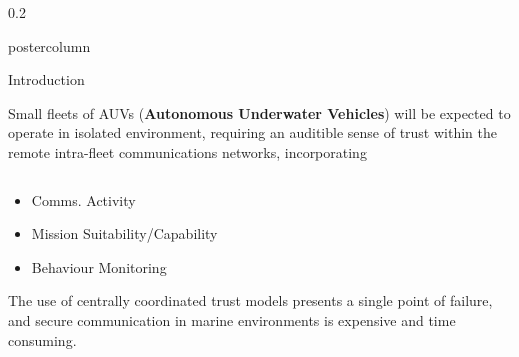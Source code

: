 \documentclass[final,hyperref={pdfpagelabels=false}]{beamer}
\def\colwidth{0.2\linewidth}
\begin{document}
\begin{frame}[fragile]
\begin{columns}[T]
\begin{column}{\colwidth}
\begin{beamercolorbox}[center,wd=\textwidth]{postercolumn}
\begin{minipage}[T]{.99\textwidth}
{\begin{block}{Introduction}
														 
							\vspace{0.25\baselineskip}
							Small fleets of AUVs (\textbf{Autonomous Underwater Vehicles}) will be expected to operate in isolated environment, requiring an auditible sense of trust within the remote intra-fleet communications networks, incorporating
														
							\begin{columns}[T]
								\begin{column}{0.416\textwidth}
									
									\begin{itemize}
										\item Comms. Activity
										\item Mission Suitability/Capability
										\item Behaviour Monitoring
									\end{itemize}
									
									The use of centrally coordinated trust models presents a single point of failure, and secure communication in marine environments is expensive and time consuming. 
									

\end{column}
\end{columns}
\end{block}}
\end{minipage}
\end{beamercolorbox}
\end{column}
\end{columns}
\end{frame}
\end{document}
